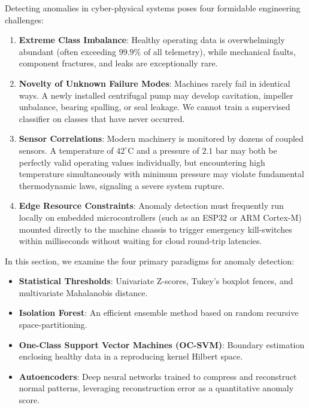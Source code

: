 Detecting anomalies in cyber-physical systems poses four formidable engineering challenges:
\begin{enumerate}
    \item \textbf{Extreme Class Imbalance}: Healthy operating data is overwhelmingly abundant (often exceeding $99.9\%$ of all telemetry), while mechanical faults, component fractures, and leaks are exceptionally rare.
    \item \textbf{Novelty of Unknown Failure Modes}: Machines rarely fail in identical ways. A newly installed centrifugal pump may develop cavitation, impeller unbalance, bearing spalling, or seal leakage. We cannot train a supervised classifier on classes that have never occurred.
    \item \textbf{Sensor Correlations}: Modern machinery is monitored by dozens of coupled sensors. A temperature of $42^\circ\text{C}$ and a pressure of $2.1\text{ bar}$ may both be perfectly valid operating values individually, but encountering high temperature simultaneously with minimum pressure may violate fundamental thermodynamic laws, signaling a severe system rupture.
    \item \textbf{Edge Resource Constraints}: Anomaly detection must frequently run locally on embedded microcontrollers (such as an ESP32 or ARM Cortex-M) mounted directly to the machine chassis to trigger emergency kill-switches within milliseconds without waiting for cloud round-trip latencies.
\end{enumerate}

In this section, we examine the four primary paradigms for anomaly detection:
\begin{itemize}
    \item \textbf{Statistical Thresholds}: Univariate Z-scores, Tukey's boxplot fences, and multivariate Mahalanobis distance.
    \item \textbf{Isolation Forest}: An efficient ensemble method based on random recursive space-partitioning.
    \item \textbf{One-Class Support Vector Machines (OC-SVM)}: Boundary estimation enclosing healthy data in a reproducing kernel Hilbert space.
    \item \textbf{Autoencoders}: Deep neural networks trained to compress and reconstruct normal patterns, leveraging reconstruction error as a quantitative anomaly score.
\end{itemize}

